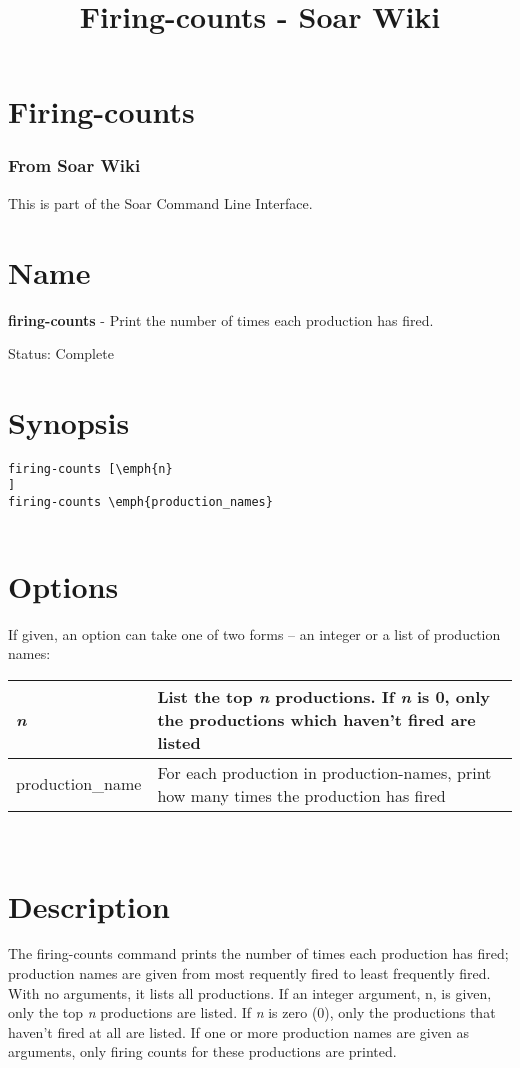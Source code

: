 \documentclass[10pt]{article}
\title{Firing-counts - Soar Wiki}
\begin{document}
\section*{Firing-counts}
\subsubsection*{From Soar Wiki}


 This is part of the Soar Command Line Interface. 
\section*{ Name }


 \textbf{firing-counts}
 - Print the number of times each production has fired. 


 Status: Complete
\section*{ Synopsis }
\begin{verbatim}
firing-counts [\emph{n}
]
firing-counts \emph{production_names}


\end{verbatim}
\section*{ Options }


 If given, an option can take one of two forms -- an integer or a list of production names: 

\begin{tabular}{|p{1in}|p{5in}|}
\hline 
\emph{n}
 & List the top \emph{n}
 productions. If \emph{n}
 is 0, only the productions which haven't fired are listed  \\
 \hline 
 production\_name  & For each production in production-names, print how many times the production has fired  \\
 \hline 

\end{tabular}




 \\ 

\section*{ Description }


 The firing-counts command prints the number of times each production has fired; production names are given from most requently fired to least frequently fired. With no arguments, it lists all productions. If an integer argument, n, is given, only the top \emph{n}
 productions are listed. If \emph{n}
 is zero (0), only the productions that haven't fired at all are listed. If one or more production names are given as arguments, only firing counts for these productions are printed. 
\end{document}
